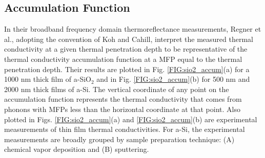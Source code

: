 \documentclass[aps,prb,twocolumn,superscriptaddress,footinbib,amsmath,amssymb,floatfix]{revtex4}
\begin{document}

\subsection{\label{S:Accumulation}Accumulation Function}

In their broadband frequency domain thermoreflectance 
measurements, Regner et al.,\cite{regner_broadband_2013}  
adopting the convention of Koh and Cahill,\cite{koh_frequency_2007} 
interpret the  
measured thermal conductivity at a given thermal penetration depth 
to be representative of the thermal conductivity accumulation 
function at a MFP equal to the thermal penetration depth.  
Their results are plotted in Fig. \ref{FIG:sio2_accum}(a) 
for a 1000 nm thick film of a-SiO$_2$ 
and in Fig. \ref{FIG:sio2_accum}(b) for 500 nm and 
2000 nm thick films of a-Si. The vertical coordinate 
of any point on the accumulation function represents the thermal 
conductivity that comes from phonons with MFPs less than the 
horizontal coordinate at that point. Also plotted in 
Figs. \ref{FIG:sio2_accum}(a) and \ref{FIG:sio2_accum}(b) 
are experimental measurements of thin film thermal 
conductivities. For a-Si, the experimental measurements are 
broadly grouped by sample preparation technique: 
(A) chemical vapor deposition
\cite{moon_thermal_2002,liu_high_2009,yang_anomalously_2010}
and (B) sputtering.
\cite{kuo_thermal_1992,cahill_thermal_1994,wada_thermal_1996} 
\end{document}
